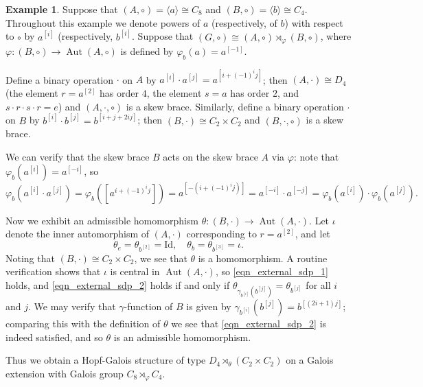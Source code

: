 \documentclass[12pt,a4paper, reqno]{amsart}
\theoremstyle{definition}
\newtheorem{example}[theorem]{Example}
\DeclareMathOperator{\Aut}{\mbox{Aut}}
\begin{document}
\begin{example}
Suppose that $ (A,\circ) = \langle a \rangle \cong C_{8} $ and $ (B,\circ) = \langle b \rangle \cong C_{4} $. Throughout this example we denote powers of $ a $ (respectively, of $ b $) with respect to $ \circ $ by $ a^{[i]} $ (respectively, $ b^{[i]} $. Suppose that $ (G,\circ) \cong (A,\circ) \rtimes_{\varphi} (B,\circ) $, where $ \varphi : (B,\circ) \rightarrow \Aut(A,\circ) $ is defined by $ \varphi_{b}(a) = a^{[-1]} $.

Define a binary operation $ \cdot $ on $ A $ by $ a^{[i]} \cdot a^{[j]} = a^{[i+(-1)^{i}j]} $; then $ (A,\cdot) \cong D_{4} $ (the element $ r=a^{[2]} $ has order $ 4 $, the element $ s=a $ has order $ 2 $, and $ s \cdot r \cdot s \cdot r = e $) and $ (A,\cdot,\circ) $ is a skew brace. Similarly, define a binary operation $ \cdot $ on $ B $ by $ b^{[i]} \cdot b^{[j]} = b^{[i+j+2ij]} $; then $ (B,\cdot) \cong C_{2} \times C_{2} $ and $ (B,\cdot,\circ) $ is a skew brace. 

We can verify that the skew brace $ B $ acts on the skew brace $ A $ via $ \varphi $: note that $ \varphi_{b}(a^{[i]})=a^{[-i]} $, so
\[ \varphi_{b}(a^{[i]} \cdot a^{[j]}) = \varphi_{b}([a^{i+(-1)^{i}j}]) = a^{[-(i+(-1)^{i}j)]} = a^{[-i]} \cdot a^{[-j]} = \varphi_{b}(a^{[i]}) \cdot \varphi_{b}(a^{[j]}). \]

Now we exhibit an admissible homomorphism $ \theta : (B,\cdot) \rightarrow \Aut(A,\cdot) $. Let $ \iota $ denote the inner automorphism of $ (A,\cdot) $ corresponding to $ r=a^{[2]} $, and let
\[ \theta_{e}=\theta_{b^{[2]}} = \mathrm{Id}, \quad \theta_{b}=\theta_{b^{[3]}} = \iota. \]
Noting that $ (B,\cdot) \cong C_{2} \times C_{2} $, we see that $ \theta $ is a homomorphism. A routine verification shows that $ \iota $ is central in $ \Aut(A,\cdot) $, so \eqref{eqn_external_sdp_1} holds, and \eqref{eqn_external_sdp_2} holds if and only if $ \theta_{\gamma_{b^{[i]}}(b^{[j]})} = \theta_{b^{[j]}} $ for all $ i $ and $ j $. We may verify that $ \gamma $-function of $ B $ is given by $ \gamma_{b^{[i]}}(b^{[j]}) = b^{[(2i+1)j]} $; comparing this with the definition of $ \theta $ we see that \eqref{eqn_external_sdp_2} is indeed satisfied, and so $ \theta $ is an admissible homomorphism. 

Thus we obtain a Hopf-Galois structure of type $ D_{4} \rtimes_{\theta} (C_{2} \times C_{2}) $ on a Galois extension with Galois group $ C_{8} \rtimes_{\varphi} C_{4} $. 
\end{example}
\end{document}
